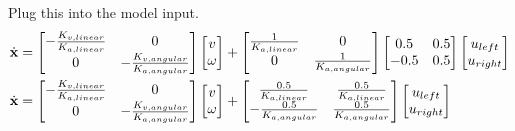 Plug this into the model input.
\begin{align*}
  \dot{\mathbf{x}} &=
  \begin{bmatrix}
    -\frac{K_{v,linear}}{K_{a,linear}} & 0 \\
    0 & -\frac{K_{v,angular}}{K_{a,angular}}
  \end{bmatrix}
  \begin{bmatrix}
    v \\
    \omega
  \end{bmatrix} +
  \begin{bmatrix}
    \frac{1}{K_{a,linear}} & 0 \\
    0 & \frac{1}{K_{a,angular}}
  \end{bmatrix}
  \begin{bmatrix}
    0.5 & 0.5 \\
    -0.5 & 0.5
  \end{bmatrix}
  \begin{bmatrix}
    u_{left} \\
    u_{right}
  \end{bmatrix} \\
  \dot{\mathbf{x}} &=
  \begin{bmatrix}
    -\frac{K_{v,linear}}{K_{a,linear}} & 0 \\
    0 & -\frac{K_{v,angular}}{K_{a,angular}}
  \end{bmatrix}
  \begin{bmatrix}
    v \\
    \omega
  \end{bmatrix} +
  \begin{bmatrix}
    \frac{0.5}{K_{a,linear}} & \frac{0.5}{K_{a,linear}} \\
    -\frac{0.5}{K_{a,angular}} & \frac{0.5}{K_{a,angular}}
  \end{bmatrix}
  \begin{bmatrix}
    u_{left} \\
    u_{right}
  \end{bmatrix}
\end{align*}
